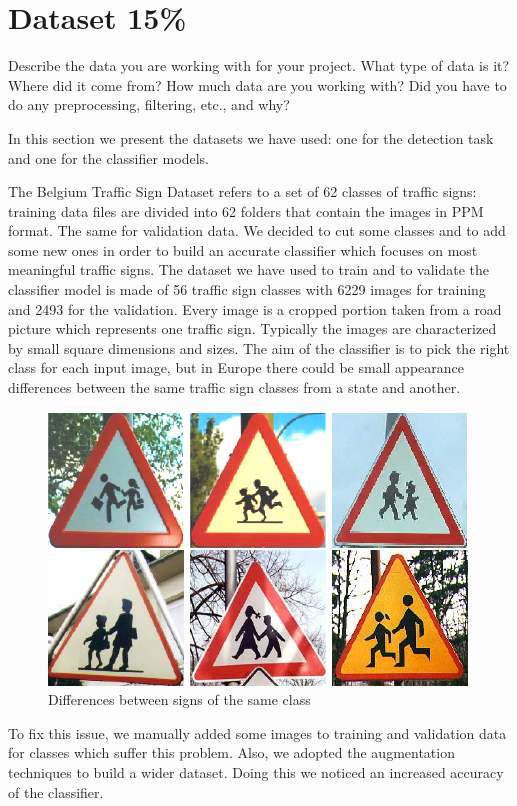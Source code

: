 \section{Dataset 15\%}
Describe the data you are working with for your project. What type of data is it? Where did it come from? How much data are you working with? Did you have to do any preprocessing, filtering, etc., and why?

In this section we present the datasets we have used: one for the detection task and one for the classifier models. 



The Belgium Traffic Sign Dataset refers to a set of 62 classes of traffic signs: training data files are divided into 62 folders that contain the images in PPM format. The same for validation data. We decided to cut some classes and to add some new ones in order to build an accurate classifier which focuses on most meaningful traffic signs. The dataset we have used to train and to validate the classifier model is made of 56 traffic sign classes with 6229 images for training and 2493 for the validation. Every image is a cropped portion taken from a road picture which represents one traffic sign. Typically the images are characterized by small square dimensions and sizes. The aim of the classifier is to pick the right class for each input image, but in Europe there could be small appearance differences between the same traffic sign classes from a state and another. 
\begin{figure}[h]{}
	\centering
	\includegraphics[width=0.6\linewidth]{Img/differences.png}
	\caption{Differences between signs of the same class}\label{}
\end{figure}

To fix this issue, we manually added some images to training and validation data for classes which suffer this problem. Also, we adopted the augmentation techniques to build a wider dataset. Doing this we noticed an increased accuracy of the classifier. 